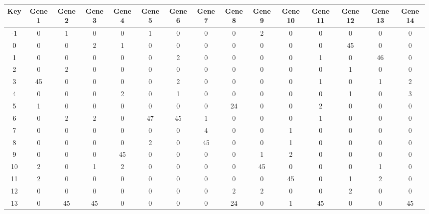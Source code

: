 \begin{tabular}{|c|c|c|c|c|c|c|c|c|c|c|c|c|c|c|}
\hline
Key & Gene 1 & Gene 2 & Gene 3 & Gene 4 & Gene 5 & Gene 6 & Gene 7 & Gene 8 & Gene 9 & Gene 10 & Gene 11 & Gene 12 & Gene 13 & Gene 14 \\
\hline
-1 & 0 & 1 & 0 & 0 & 1 & 0 & 0 & 0 & 2 & 0 & 0 & 0 & 0 & 0 \\
0 & 0 & 0 & 2 & 1 & 0 & 0 & 0 & 0 & 0 & 0 & 0 & 45 & 0 & 0 \\
1 & 0 & 0 & 0 & 0 & 0 & 2 & 0 & 0 & 0 & 0 & 1 & 0 & 46 & 0 \\
2 & 0 & 2 & 0 & 0 & 0 & 0 & 0 & 0 & 0 & 0 & 0 & 1 & 0 & 0 \\
3 & 45 & 0 & 0 & 0 & 0 & 2 & 0 & 0 & 0 & 0 & 1 & 0 & 1 & 2 \\
4 & 0 & 0 & 0 & 2 & 0 & 1 & 0 & 0 & 0 & 0 & 0 & 1 & 0 & 3 \\
5 & 1 & 0 & 0 & 0 & 0 & 0 & 0 & 24 & 0 & 0 & 2 & 0 & 0 & 0 \\
6 & 0 & 2 & 2 & 0 & 47 & 45 & 1 & 0 & 0 & 0 & 1 & 0 & 0 & 0 \\
7 & 0 & 0 & 0 & 0 & 0 & 0 & 4 & 0 & 0 & 1 & 0 & 0 & 0 & 0 \\
8 & 0 & 0 & 0 & 0 & 2 & 0 & 45 & 0 & 0 & 1 & 0 & 0 & 0 & 0 \\
9 & 0 & 0 & 0 & 45 & 0 & 0 & 0 & 0 & 1 & 2 & 0 & 0 & 0 & 0 \\
10 & 2 & 0 & 1 & 2 & 0 & 0 & 0 & 0 & 45 & 0 & 0 & 0 & 1 & 0 \\
11 & 2 & 0 & 0 & 0 & 0 & 0 & 0 & 0 & 0 & 45 & 0 & 1 & 2 & 0 \\
12 & 0 & 0 & 0 & 0 & 0 & 0 & 0 & 2 & 2 & 0 & 0 & 2 & 0 & 0 \\
13 & 0 & 45 & 45 & 0 & 0 & 0 & 0 & 24 & 0 & 1 & 45 & 0 & 0 & 45 \\
\hline
\end{tabular}
